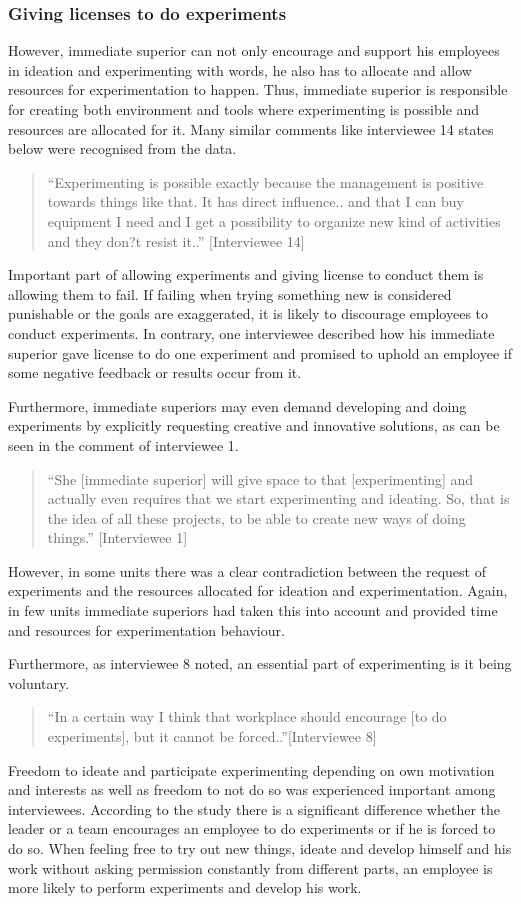 \subsubsection{Giving licenses to do experiments}
However, immediate superior can not only encourage and support his employees in ideation and experimenting with words, he also has to allocate and allow resources for experimentation to happen. Thus, immediate superior is responsible for creating both environment and tools where experimenting is possible and resources are allocated for it. Many similar comments like interviewee 14 states below were recognised from the data. 
\begin{quote}
``Experimenting is possible exactly because the management is positive towards things like that. It has direct influence.. and that I can buy equipment I need and I get a possibility to organize new kind of activities and they don?t resist it..'' [Interviewee 14]
\end{quote}
Important part of allowing experiments and giving license to conduct them is allowing them to fail. If failing when trying something new is considered punishable or the goals are exaggerated, it is likely to discourage employees to conduct experiments. In contrary, one interviewee described how his immediate superior gave license to do one experiment and promised to uphold an employee if some negative feedback or results occur from it. 

Furthermore, immediate superiors may even demand developing and doing experiments by explicitly requesting creative and innovative solutions, as can be seen in the comment of interviewee 1. 
\begin{quote}
``She [immediate superior] will give space to that [experimenting] and actually even requires that we start experimenting and ideating. So, that is the idea of all these projects, to be able to create new ways of doing things.'' [Interviewee 1]
\end{quote}
However, in some units there was a clear contradiction between the request of experiments and the resources allocated for ideation and experimentation. Again, in few units immediate superiors had taken this into account and provided time and resources for experimentation behaviour. 

Furthermore, as interviewee 8 noted, an essential part of experimenting is it being voluntary.
\begin{quote}
``In a certain way I think that workplace should encourage [to do experiments], but it cannot be forced..''[Interviewee 8]
\end{quote}
Freedom to ideate and participate experimenting depending on own motivation and interests as well as freedom to not do so was experienced important among interviewees. According to the study there is a significant difference whether the leader or a team encourages an employee to do experiments or if he is forced to do so. When feeling free to try out new things, ideate and develop himself and his work without asking permission constantly from different parts, an employee is more likely to perform experiments and develop his work.

